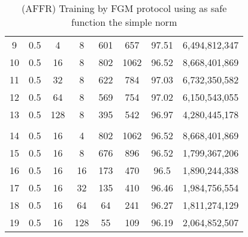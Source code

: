\begin{table}[H]
\begin{tabular}{|c|c|c|c|c|c|c|c|}
        9                      & 0.5                   & 4                     & 8                     & 601                   & 657                   & 97.51                 & 6,494,812,347            \\
        10                     & 0.5                   & 16                    & 8                     & 802                   & 1062                  & 96.52                 & 8,668,401,869            \\
        11                     & 0.5                   & 32                    & 8                     & 622                   & 784                   & 97.03                 & 6,732,350,582            \\
        12                     & 0.5                   & 64                    & 8                     & 569                   & 754                   & 97.02                 & 6,150,543,055            \\
        13                     & 0.5                   & 128                   & 8                     & 395                   & 542                   & 96.97                 & 4,280,445,178            \\
        \hline
        \multicolumn{1}{|l|}{} & \multicolumn{1}{l|}{} & \multicolumn{1}{l|}{} & \multicolumn{1}{l|}{} & \multicolumn{1}{l|}{} & \multicolumn{1}{l|}{} & \multicolumn{1}{l|}{} & \multicolumn{1}{l|}{}    \\
        \hline
        14                     & 0.5                   & 16                    & 4                     & 802                   & 1062                  & 96.52                 & 8,668,401,869            \\
        15                     & 0.5                   & 16                    & 8                     & 676                   & 896                   & 96.52                 & 1,799,367,206            \\
        16                     & 0.5                   & 16                    & 16                    & 173                   & 470                   & 96.5                  & 1,890,244,338            \\
        17                     & 0.5                   & 16                    & 32                    & 135                   & 410                   & 96.46                 & 1,984,756,554            \\
        18                     & 0.5                   & 16                    & 64                    & 64                    & 241                   & 96.27                 & 1,811,274,129            \\
        19                     & 0.5                   & 16                    & 128                   & 55                    & 109                   & 96.19                 & 2,064,852,507            \\
        \hline
    \end{tabular}
    \caption{(AFFR) Training by FGM protocol using as safe function the simple norm}
    \label{tab:table-fgm-sf1-nlp-exp}
\end{table}

